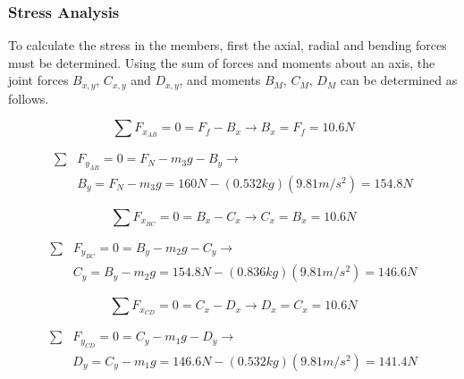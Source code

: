 \subsubsection{Stress Analysis}
To calculate the stress in the members, first the axial, radial and bending forces must be determined. Using the sum of forces and moments about an axis, the joint forces $B_{x,y}$, $C_{x,y}$ and $D_{x,y}$, and moments $B_M$, $C_M$, $D_M$ can be determined as follows.

\begin{equation}
\sum F_{x_{AB}} = 0 = F_f - B_x \rightarrow B_x = F_f = 10.6N
\end{equation}

\begin{equation}
\begin{split}
        \sum &F_{y_{AB}} = 0 = F_N - m_3 g -B_y \rightarrow
        \\
        &B_y = F_N - m_3 g = 160N-(0.532kg)(9.81m/s^2) = 154.8N
    \end{split}
\end{equation}

\begin{equation}
\sum F_{x_{BC}} = 0 = B_x - C_x \rightarrow C_x = B_x = 10.6N
\end{equation}

\begin{equation}
\begin{split}
        \sum &F_{y_{BC}} = 0 = B_y - m_2 g -C_y \rightarrow 
        \\
        &C_y = B_y - m_2 g = 154.8N - (0.836 kg)(9.81m/s^2) = 146.6N
    \end{split}
\end{equation}

\begin{equation}
\sum F_{x_{CD}} = 0 = C_x - D_x \rightarrow D_x = C_x = 10.6N
\end{equation}

\begin{equation}
    \begin{split}
        \sum &F_{y_{CD}} = 0 = C_y - m_1 g -D_y \rightarrow 
        \\ 
        &D_y = C_y - m_1 g = 146.6N - (0.532kg)(9.81m/s^2) = 141.4N
    \end{split}
\end{equation}
    
